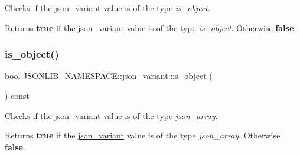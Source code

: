 Checks if the \hyperlink{classJSONLIB__NAMESPACE_1_1json__variant}{json\+\_\+variant} value is of the type {\itshape is\+\_\+object}. 

\begin{DoxyReturn}{Returns}
{\bfseries true} if the \hyperlink{classJSONLIB__NAMESPACE_1_1json__variant}{json\+\_\+variant} value is of the type {\itshape is\+\_\+object}. Otherwise {\bfseries false}. 
\end{DoxyReturn}
\mbox{\label{classJSONLIB__NAMESPACE_1_1json__variant_a28b4156626bd9f0e344ba1704c7590f3}} 
\subsubsection{\texorpdfstring{is\+\_\+object()}{is\_object()}}
{\footnotesize\ttfamily bool J\+S\+O\+N\+L\+I\+B\+\_\+\+N\+A\+M\+E\+S\+P\+A\+C\+E\+::json\+\_\+variant\+::is\+\_\+object (\begin{DoxyParamCaption}{ }\end{DoxyParamCaption}) const}



Checks if the \hyperlink{classJSONLIB__NAMESPACE_1_1json__variant}{json\+\_\+variant} value is of the type {\itshape json\+\_\+array}. 

\begin{DoxyReturn}{Returns}
{\bfseries true} if the \hyperlink{classJSONLIB__NAMESPACE_1_1json__variant}{json\+\_\+variant} value is of the type {\itshape json\+\_\+array}. Otherwise {\bfseries false}. 
\end{DoxyReturn}
\mbox{\label{classJSONLIB__NAMESPACE_1_1json__variant_ae097a22fe419dd083ff07bfebf0e8151}} 
